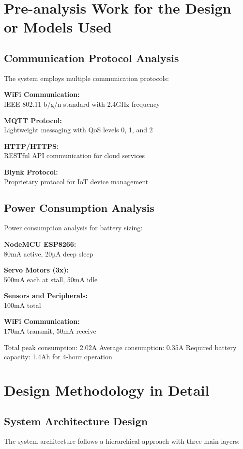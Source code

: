 \section{Pre-analysis Work for the Design or Models Used}

\subsection{Communication Protocol Analysis}
The system employs multiple communication protocols:

\textbf{WiFi Communication:}
\\IEEE 802.11 b/g/n standard with 2.4GHz frequency

\textbf{MQTT Protocol:}
\\Lightweight messaging with QoS levels 0, 1, and 2

\textbf{HTTP/HTTPS:}
\\RESTful API communication for cloud services

\textbf{Blynk Protocol:}
\\Proprietary protocol for IoT device management

\subsection{Power Consumption Analysis}
Power consumption analysis for battery sizing:

\textbf{NodeMCU ESP8266:}
\\80mA active, 20µA deep sleep

\textbf{Servo Motors (3x):}
\\500mA each at stall, 50mA idle

\textbf{Sensors and Peripherals:}
\\100mA total

\textbf{WiFi Communication:}
\\170mA transmit, 50mA receive

Total peak consumption: 2.02A
Average consumption: 0.35A
Required battery capacity: 1.4Ah for 4-hour operation

\section{Design Methodology in Detail}

\subsection{System Architecture Design}
The system architecture follows a hierarchical approach with three main layers:

